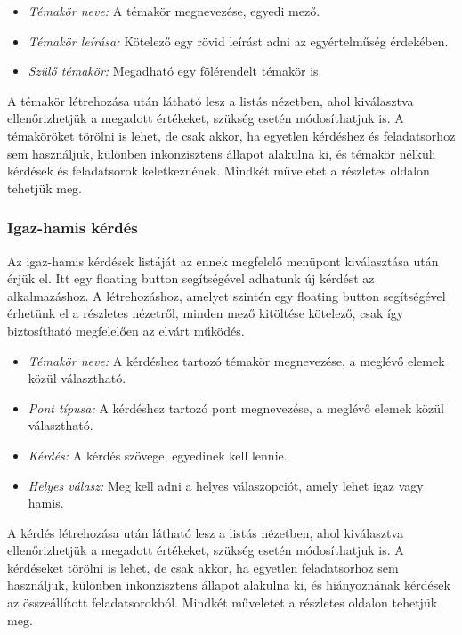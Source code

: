 \begin{itemize}
    \item \emph{Témakör neve:} A témakör megnevezése, egyedi mező.
    \item \emph{Témakör leírása:} Kötelező egy rövid leírást adni az egyértelműség érdekében.
    \item \emph{Szülő témakör:} Megadható egy fölérendelt témakör is.
\end{itemize}

A témakör létrehozása után látható lesz a listás nézetben, ahol kiválasztva ellenőrizhetjük a megadott értékeket, szükség esetén módosíthatjuk is.
A témaköröket törölni is lehet, de csak akkor, ha egyetlen kérdéshez és feladatsorhoz sem használjuk, különben inkonzisztens állapot alakulna ki, és témakör nélküli kérdések és feladatsorok keletkeznének.
Mindkét műveletet a részletes oldalon tehetjük meg.

\subsubsection{Igaz-hamis kérdés}

Az igaz-hamis kérdések listáját az ennek megfelelő menüpont kiválasztása után érjük el.
Itt egy floating button segítségével adhatunk új kérdést az alkalmazáshoz.
A létrehozáshoz, amelyet szintén egy floating button segítségével érhetünk el a részletes nézetről, minden mező kitöltése kötelező, csak így biztosítható megfelelően az elvárt működés.

\begin{itemize}
    \item \emph{Témakör neve:} A kérdéshez tartozó témakör megnevezése, a meglévő elemek közül választható.
    \item \emph{Pont típusa:} A kérdéshez tartozó pont megnevezése, a meglévő elemek közül választható.
    \item \emph{Kérdés:} A kérdés szövege, egyedinek kell lennie.
    \item \emph{Helyes válasz:} Meg kell adni a helyes válaszopciót, amely lehet igaz vagy hamis.
\end{itemize}

A kérdés létrehozása után látható lesz a listás nézetben, ahol kiválasztva ellenőrizhetjük a megadott értékeket, szükség esetén módosíthatjuk is.
A kérdéseket törölni is lehet, de csak akkor, ha egyetlen feladatsorhoz sem használjuk, különben inkonzisztens állapot alakulna ki, és hiányoznának kérdések az összeállított feladatsorokból.
Mindkét műveletet a részletes oldalon tehetjük meg.

